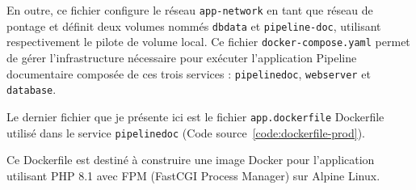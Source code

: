 En outre, ce fichier configure le réseau \Verb|app-network| en tant que réseau de pontage et définit deux volumes nommés \Verb|dbdata| et \Verb|pipeline-doc|, utilisant respectivement le pilote de volume local. Ce fichier \Verb|docker-compose.yaml| permet de gérer l'infrastructure nécessaire pour exécuter l'application Pipeline documentaire composée de ces trois services : \Verb|pipelinedoc|, \Verb|webserver| et \Verb|database|.

Le dernier fichier que je présente ici est le fichier \Verb|app.dockerfile| Dockerfile utilisé dans le service \Verb|pipelinedoc| (Code source~\ref{code:dockerfile-prod}).


Ce Dockerfile est destiné à construire une image Docker pour l'application utilisant PHP 8.1 avec FPM (FastCGI Process Manager) sur Alpine Linux.

